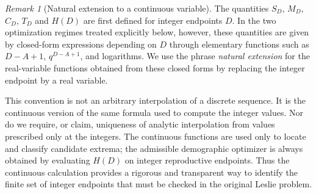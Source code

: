 \documentclass[10pt,a4paper]{amsart}
\theoremstyle{definition}
\theoremstyle{remark}
\newtheorem{rem}[thm]{Remark}
\numberwithin{equation}{section}
\begin{document}
%	
%	
%	
%	



\begin{rem}[Natural extension to a continuous variable]
\label{rem_extensions}
The quantities $S_D$, $M_D$, $C_D$, $T_D$ and $H(D)$ are first defined for integer endpoints $D$. In the two optimization regimes treated explicitly below, however, these quantities are given by closed-form expressions depending on $D$ through elementary functions such as $D-A+1$, $q^{D-A+1}$, and logarithms. We use the phrase \emph{natural extension} for the real-variable functions obtained from these closed forms by replacing the integer endpoint by a real variable.

This convention is not an arbitrary interpolation of a discrete sequence. It is the continuous version of the same formula used to compute the integer values. Nor do we require, or claim, uniqueness of analytic interpolation from values prescribed only at the integers. The continuous functions are used only to locate and classify candidate extrema; the admissible demographic optimizer is always obtained by evaluating $H(D)$ on integer reproductive endpoints. Thus the continuous calculation provides a rigorous and transparent way to identify the finite set of integer endpoints that must be checked in the original Leslie problem.
\end{rem}
\end{document}
